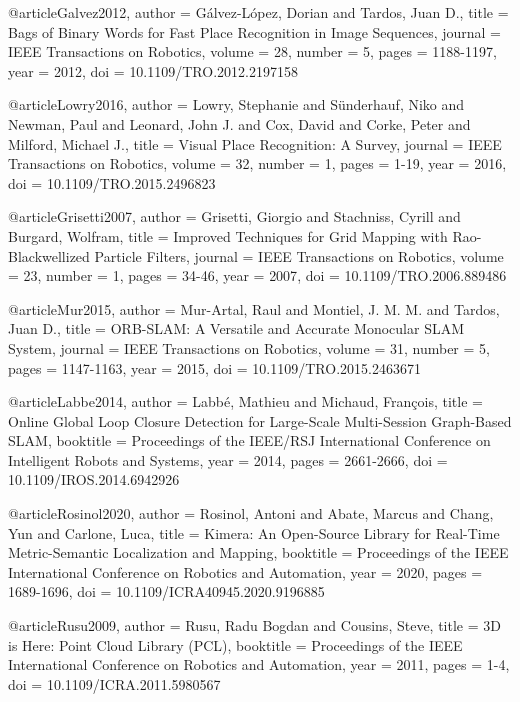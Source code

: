 @article{Galvez2012,
  author = {Gálvez-López, Dorian and Tardos, Juan D.},
  title = {Bags of Binary Words for Fast Place Recognition in Image Sequences},
  journal = {IEEE Transactions on Robotics},
  volume = {28},
  number = {5},
  pages = {1188-1197},
  year = {2012},
  doi = {10.1109/TRO.2012.2197158}
}

@article{Lowry2016,
  author = {Lowry, Stephanie and Sünderhauf, Niko and Newman, Paul and Leonard, John J. and Cox, David and Corke, Peter and Milford, Michael J.},
  title = {Visual Place Recognition: A Survey},
  journal = {IEEE Transactions on Robotics},
  volume = {32},
  number = {1},
  pages = {1-19},
  year = {2016},
  doi = {10.1109/TRO.2015.2496823}
}

@article{Grisetti2007,
  author = {Grisetti, Giorgio and Stachniss, Cyrill and Burgard, Wolfram},
  title = {Improved Techniques for Grid Mapping with Rao-Blackwellized Particle Filters},
  journal = {IEEE Transactions on Robotics},
  volume = {23},
  number = {1},
  pages = {34-46},
  year = {2007},
  doi = {10.1109/TRO.2006.889486}
}

@article{Mur2015,
  author = {Mur-Artal, Raul and Montiel, J. M. M. and Tardos, Juan D.},
  title = {ORB-SLAM: A Versatile and Accurate Monocular SLAM System},
  journal = {IEEE Transactions on Robotics},
  volume = {31},
  number = {5},
  pages = {1147-1163},
  year = {2015},
  doi = {10.1109/TRO.2015.2463671}
}

@article{Labbe2014,
  author = {Labbé, Mathieu and Michaud, François},
  title = {Online Global Loop Closure Detection for Large-Scale Multi-Session Graph-Based SLAM},
  booktitle = {Proceedings of the IEEE/RSJ International Conference on Intelligent Robots and Systems},
  year = {2014},
  pages = {2661-2666},
  doi = {10.1109/IROS.2014.6942926}
}

@article{Rosinol2020,
  author = {Rosinol, Antoni and Abate, Marcus and Chang, Yun and Carlone, Luca},
  title = {Kimera: An Open-Source Library for Real-Time Metric-Semantic Localization and Mapping},
  booktitle = {Proceedings of the IEEE International Conference on Robotics and Automation},
  year = {2020},
  pages = {1689-1696},
  doi = {10.1109/ICRA40945.2020.9196885}
}

@article{Rusu2009,
  author = {Rusu, Radu Bogdan and Cousins, Steve},
  title = {3D is Here: Point Cloud Library (PCL)},
  booktitle = {Proceedings of the IEEE International Conference on Robotics and Automation},
  year = {2011},
  pages = {1-4},
  doi = {10.1109/ICRA.2011.5980567}
}

